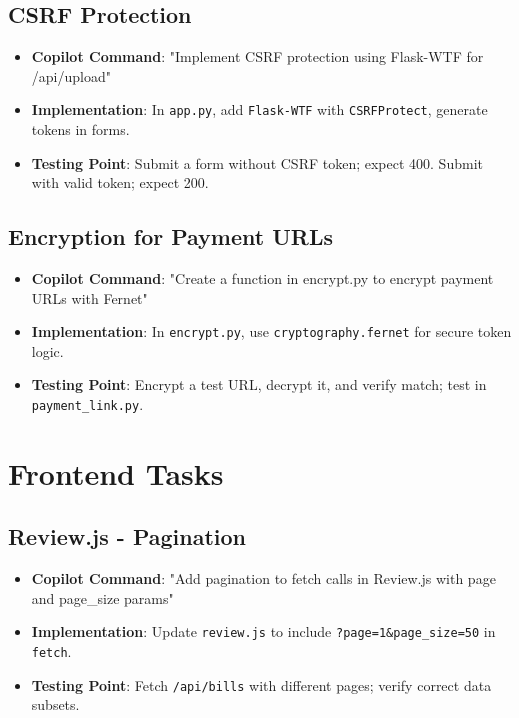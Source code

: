 \documentclass[a4paper,12pt]{article}
\begin{document}
\subsection{CSRF Protection}
\begin{itemize}
    \item \textbf{Copilot Command}: "Implement CSRF protection using Flask-WTF for /api/upload"
    \item \textbf{Implementation}: In \texttt{app.py}, add \texttt{Flask-WTF} with \texttt{CSRFProtect}, generate tokens in forms.
    \item \textbf{Testing Point}: Submit a form without CSRF token; expect 400. Submit with valid token; expect 200.
\end{itemize}

\subsection{Encryption for Payment URLs}
\begin{itemize}
    \item \textbf{Copilot Command}: "Create a function in encrypt.py to encrypt payment URLs with Fernet"
    \item \textbf{Implementation}: In \texttt{encrypt.py}, use \texttt{cryptography.fernet} for secure token logic.
    \item \textbf{Testing Point}: Encrypt a test URL, decrypt it, and verify match; test in \texttt{payment_link.py}.
\end{itemize}

\section{Frontend Tasks}

\subsection{Review.js - Pagination}
\begin{itemize}
    \item \textbf{Copilot Command}: "Add pagination to fetch calls in Review.js with page and page\_size params"
    \item \textbf{Implementation}: Update \texttt{review.js} to include \texttt{?page=1\&page\_size=50} in \texttt{fetch}.
    \item \textbf{Testing Point}: Fetch \texttt{/api/bills} with different pages; verify correct data subsets.
\end{itemize}
\end{document}
